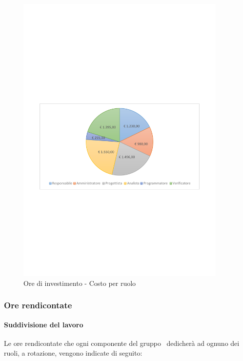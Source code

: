 \documentclass[../PianoProgetto.tex]{subfiles}
\begin{document}
	\begin{figure}[!h]
		\centering
		\includegraphics[width=0.93\textwidth , trim=2cm 9.5cm 2cm 11cm]{grafici/Riepilogo/Investimento/costo}
			\caption{Ore di investimento - Costo per ruolo}
		\label{fig:CircleChart-investimento_costo}
	\end{figure}
\vfill	

	\subsubsection{Ore rendicontate}
				\paragraph{Suddivisione del lavoro}
					Le ore rendicontate che ogni componente del gruppo \leaf\ dedicherà ad ognuno dei ruoli, a rotazione, vengono indicate di seguito:
	
\end{document}
